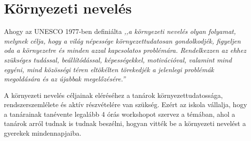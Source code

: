\section{Környezeti nevelés}
\label{sec:kornyezeti-neveles}
Ahogy az UNESCO 1977-ben definiálta \emph{,,a környezeti nevelés olyan folyamat,
    melynek célja, hogy a világ népessége környezettudatosan gondolkodjék, figyeljen oda a környezetre és minden azzal kapcsolatos problémára. Rendelkezzen az ehhez szükséges tudással, beállítódással, képességekkel, motivációval, valamint mind egyéni, mind közösségi téren eltökélten törekedjék a jelenlegi problémák megoldására és az újabbak megelőzésére.”}

A környezeti nevelés céljainak eléréséhez a tanárok környezettudatossága, rendszerszemlélete és aktív részvételére van szükség. Ezért az iskola vállalja, hogy a tanárainak tanévente legalább 4 órás workshopot szervez a témában, ahol a tanárok arról tudnak is tudnak beszélni, hogyan vitték be a környezeti nevelést a gyerekek mindennapjaiba.
